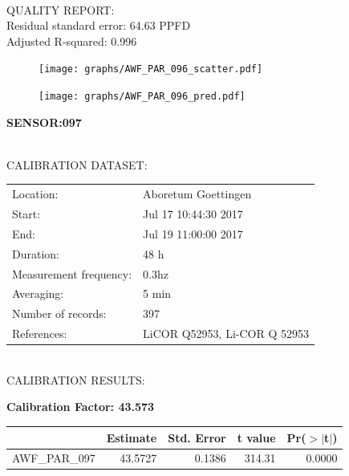 \documentclass[oneside]{report}
\begin{document}
\hrulefill\\
QUALITY REPORT:\\
Residual standard error: 64.63 PPFD\\
Adjusted R-squared: 0.996



\begin{figure}[H]
  \centering
  \texttt{[image: graphs/AWF\_PAR\_096\_scatter.pdf]}
\end{figure}




\begin{figure}[H]
  \centering
  \texttt{[image: graphs/AWF\_PAR\_096\_pred.pdf]}
\end{figure}

\pagebreak


\begin{center}
\large{\textbf{SENSOR:097}}\\
\end{center}

\hrulefill\\
CALIBRATION DATASET:\\
\begin{table}[h!]
  \centering
  \label{tab:table1}
  \begin{tabular}{ll}
    Location: & Aboretum Goettingen\\ 
    
    
    Start:  & Jul 17 10:44:30 2017 \\
    End:   & Jul 19 11:00:00 2017\\ 
    Duration: & 48 h\\
    Measurement frequency: & 0.3hz\\
    Averaging:  &5 min\\
    Number of records: & 397 \\
    References: & LiCOR Q52953, Li-COR Q 52953 \\
  \end{tabular}
\end{table}

\hrulefill\\
CALIBRATION RESULTS:\\


\begin{center}
\textbf{\large{Calibration Factor: 43.573}}\\
\end{center}
\begin{table}[ht]
\centering
\begin{tabular}{rrrrr}
  \hline
 & Estimate & Std. Error & t value & Pr($>$$|$t$|$) \\ 
  \hline
AWF\_PAR\_097 & 43.5727 & 0.1386 & 314.31 & 0.0000 \\ 
   \hline
\end{tabular}
\end{table}
\end{document}
